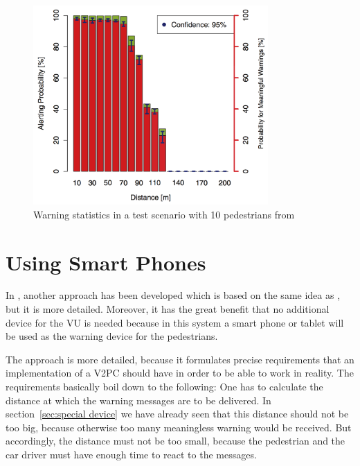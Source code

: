 \documentclass[]{ccs-thesis}
\begin{document}
\begin{figure}[h]
	\centering
	\includegraphics[width=0.8\textwidth]{figures/3_chart}
	\caption{Warning statistics in a test scenario with 10 pedestrians from \cite{v2pprotection}}%
	\label{fig:chart2}%
\end{figure}


\section{Using Smart Phones}

In \cite{v2pcomm}, another approach has been developed which is based on the same idea as \cite{v2pprotection}, but it is more detailed. Moreover, it has the great benefit that no additional device for the \ac{VU} is needed because in this system a smart phone or tablet will be used as the warning device for the pedestrians.

The approach is more detailed, because it formulates precise requirements that an implementation of a \ac{V2PC} should have in order to be able to work in reality. The  requirements basically boil down to the following: One has to calculate the distance at which the warning messages are to be delivered. In section~\ref{sec:special device} we have already seen that this distance should not be too big, because otherwise too many meaningless warning would be received. But accordingly, the distance must not be too small, because the pedestrian and the car driver must have enough time to react to the messages.
\end{document}
